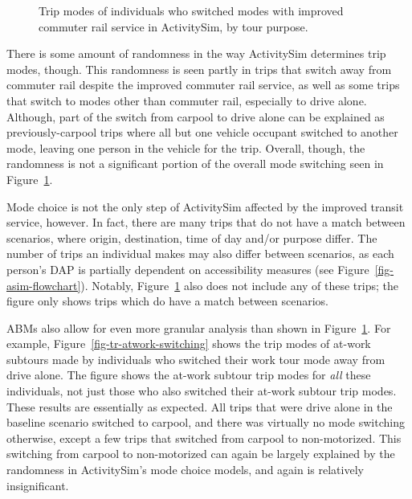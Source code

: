 \documentclass[fancy, twoside, mastersfancy, ms]{byuthesis}
\begin{document}
\begin{figure}


\caption[Trip modes of individuals who switched modes with improved
commuter rail service in ActivitySim.]{\label{fig-tr-mode-switching}Trip
modes of individuals who switched modes with improved commuter rail
service in ActivitySim, by tour purpose.}

\end{figure}%

There is some amount of randomness in the way ActivitySim determines
trip modes, though. This randomness is seen partly in trips that switch
away from commuter rail despite the improved commuter rail service, as
well as some trips that switch to modes other than commuter rail,
especially to drive alone. Although, part of the switch from carpool to
drive alone can be explained as previously-carpool trips where all but
one vehicle occupant switched to another mode, leaving one person in the
vehicle for the trip. Overall, though, the randomness is not a
significant portion of the overall mode switching seen in
Figure~\ref{fig-tr-mode-switching}.

Mode choice is not the only step of ActivitySim affected by the improved
transit service, however. In fact, there are many trips that do not have
a match between scenarios, where origin, destination, time of day and/or
purpose differ. The number of trips an individual makes may also differ
between scenarios, as each person's DAP is partially dependent on
accessibility measures (see Figure~\ref{fig-asim-flowchart}). Notably,
Figure~\ref{fig-tr-mode-switching} also does not include any of these
trips; the figure only shows trips which do have a match between
scenarios.

ABMs also allow for even more granular analysis than shown in
Figure~\ref{fig-tr-mode-switching}. For example,
Figure~\ref{fig-tr-atwork-switching} shows the trip modes of at-work
subtours made by individuals who switched their work tour mode away from
drive alone. The figure shows the at-work subtour trip modes for
\emph{all} these individuals, not just those who also switched their
at-work subtour trip modes. These results are essentially as expected.
All trips that were drive alone in the baseline scenario switched to
carpool, and there was virtually no mode switching otherwise, except a
few trips that switched from carpool to non-motorized. This switching
from carpool to non-motorized can again be largely explained by the
randomness in ActivitySim's mode choice models, and again is relatively
insignificant.
\end{document}
